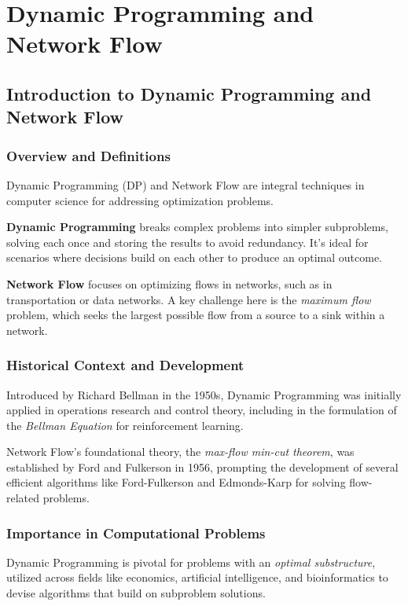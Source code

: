 \documentclass[12pt]{book} %
\begin{document}
\chapter{Dynamic Programming and Network Flow}
\section{Introduction to Dynamic Programming and Network Flow}

\subsection{Overview and Definitions}
Dynamic Programming (DP) and Network Flow are integral techniques in computer science for addressing optimization problems.

\textbf{Dynamic Programming} breaks complex problems into simpler subproblems, solving each once and storing the results to avoid redundancy. It's ideal for scenarios where decisions build on each other to produce an optimal outcome.

\textbf{Network Flow} focuses on optimizing flows in networks, such as in transportation or data networks. A key challenge here is the \textit{maximum flow} problem, which seeks the largest possible flow from a source to a sink within a network.

\subsection{Historical Context and Development}
Introduced by Richard Bellman in the 1950s, Dynamic Programming was initially applied in operations research and control theory, including in the formulation of the \textit{Bellman Equation} for reinforcement learning.

Network Flow's foundational theory, the \textit{max-flow min-cut theorem}, was established by Ford and Fulkerson in 1956, prompting the development of several efficient algorithms like Ford-Fulkerson and Edmonds-Karp for solving flow-related problems.

\subsection{Importance in Computational Problems}
Dynamic Programming is pivotal for problems with an \textit{optimal substructure}, utilized across fields like economics, artificial intelligence, and bioinformatics to devise algorithms that build on subproblem solutions.
\end{document}
